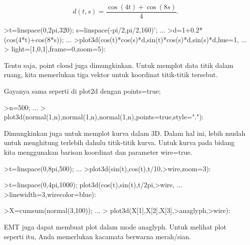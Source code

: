 \documentclass{article}
\begin{document}
\begin{eulernotebook}
\begin{eulercomment}
\begin{eulercomment}
\begin{eulercomment}
\begin{eulercomment}
\begin{eulercomment}
\end{eulercomment}
\begin{eulerformula}
\[
d(t,s) = \frac{\cos(4t)+\cos(8s)}{4}.
\]
\end{eulerformula}
\begin{eulerprompt}
>t=linspace(0,2pi,320); s=linspace(-pi/2,pi/2,160)'; ...
>d=1+0.2*(cos(4*t)+cos(8*s)); ...
>plot3d(cos(t)*cos(s)*d,sin(t)*cos(s)*d,sin(s)*d,hue=1, ...
>  light=[1,0,1],frame=0,zoom=5):
\end{eulerprompt}
\begin{eulercomment}
Tentu saja, point cloud juga dimungkinkan. Untuk memplot data titik
dalam ruang, kita memerlukan tiga vektor untuk koordinat titik-titik
tersebut.

Gayanya sama seperti di plot2d dengan points=true;
\end{eulercomment}
\begin{eulerprompt}
>n=500;  ...
>  plot3d(normal(1,n),normal(1,n),normal(1,n),points=true,style="."):
\end{eulerprompt}
\begin{eulercomment}
Dimungkinkan juga untuk memplot kurva dalam 3D. Dalam hal ini, lebih
mudah untuk menghitung terlebih dahulu titik-titik kurva. Untuk kurva
pada bidang kita menggunakan barisan koordinat dan parameter
wire=true.
\end{eulercomment}
\begin{eulerprompt}
>t=linspace(0,8pi,500); ...
>plot3d(sin(t),cos(t),t/10,>wire,zoom=3):
\end{eulerprompt}
\begin{eulerprompt}
>t=linspace(0,4pi,1000); plot3d(cos(t),sin(t),t/2pi,>wire, ...
>linewidth=3,wirecolor=blue):
\end{eulerprompt}
\begin{eulerprompt}
>X=cumsum(normal(3,100)); ...
> plot3d(X[1],X[2],X[3],>anaglyph,>wire):
\end{eulerprompt}
\begin{eulercomment}
EMT juga dapat membuat plot dalam mode anaglyph. Untuk melihat plot
seperti itu, Anda memerlukan kacamata berwarna merah/sian.
\end{eulercomment}

\end{eulercomment}
\end{eulercomment}
\end{eulercomment}
\end{eulercomment}
\end{eulernotebook}
\end{document}
